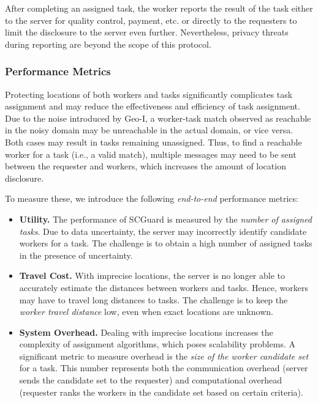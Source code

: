 \documentclass{USC-Thesis}
\renewcommand\bf\bfseries  %
\numberwithin{equation}{chapter}
\begin{document}
After completing an assigned task, the worker reports the result of the task either to the server for quality control, payment, etc. or directly to the requesters to limit the disclosure to the server even further.
Nevertheless, privacy threats during reporting are beyond the scope of this protocol.

\subsubsection{Performance Metrics}
\label{sec:metrics2}

Protecting locations of both workers and tasks significantly complicates task assignment and may reduce the effectiveness and efficiency of task assignment. Due to the noise introduced by Geo-I, a worker-task match observed as reachable in the noisy domain may be unreachable in the actual domain, or vice versa. Both cases may result in tasks remaining unassigned. Thus, to find a reachable worker for a task (i.e., a valid match), multiple messages may need to be sent between the requester and workers, which increases the amount of location disclosure.

To measure these, we introduce the following \emph{end-to-end} performance metrics:
\begin{itemize}
\item
{\bf Utility.} The performance of SCGuard is measured by the \emph{number of assigned tasks}.
Due to data uncertainty, the server may incorrectly identify candidate workers for a task. The challenge is to obtain a high number of assigned tasks in the presence of uncertainty.
\item
{\bf Travel Cost.} 
With imprecise locations, the server is no longer able to accurately estimate the distances between workers and tasks. Hence, workers may have to travel long distances to tasks. The challenge is to keep the \emph{worker travel distance} low, even when exact locations are unknown.
\item
{\bf System Overhead.} Dealing with imprecise locations increases the complexity of assignment algorithms, which
poses scalability problems. A significant metric to measure overhead is the \emph{size of the worker candidate set} for a task. This number represents both the communication overhead (server sends the candidate set to the requester) and computational overhead (requester ranks the workers in the candidate set based on certain criteria).
\end{itemize}
\end{document}
